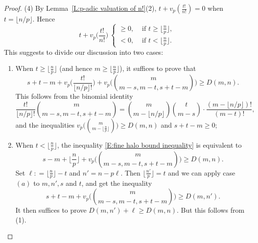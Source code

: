\documentclass[12pt]{amsart}
\theoremstyle{definition}
\numberwithin{equation}{subsection}
\begin{document}
\begin{proof}
(4) By Lemma~\ref{L:p-adic valuation of n!}(2),
$t +v_p(\frac{t!}{n!}) = 0$ when $t = \lfloor n/p\rfloor$. Hence
\[
t+v_p\Big(\frac{t!}{n!}\Big)\ \begin{cases}
\geq 0, &\text{~if~} t\geq \lfloor \frac np\rfloor,\\
<0, &\text{~if~} t<\lfloor\frac np\rfloor.
\end{cases}
\]
This suggests to divide our discussion into two cases:
\begin{enumerate}
\item[(a)] When $t\geq \lfloor\frac np\rfloor$ (and hence $m\geq \lfloor \frac np\rfloor$), it suffices to prove that
			$$
			s+t-m +v_p\Big(\frac{t!}{\lfloor n/p\rfloor!}\Big) + v_p \Big( \binom m{m-s, m-t, s+t-m} \Big) \geq D(m,n).
			$$
			This follows from the binomial identity
			$$
			\frac{t!}{\lfloor n/p\rfloor!}\binom m{m-s, m-t, s+t-m} = \binom m{m-\lfloor n/p\rfloor} \binom t{m-s} \cdot\frac{(m-\lfloor n/p\rfloor)!}{(m-t)!},
			$$
and the inequalities $v_p\big( \binom m{m-\lfloor\frac np\rfloor}\big) \geq D(m,n)$ and $s+t-m\geq 0$;
\item[(b)] When $t< \lfloor \frac np\rfloor$, the inequality 
\eqref{E:fine halo bound inequality} is equivalent to
			\begin{equation}
			\label{E:expression >=D}
			s-m + \Big\lfloor\frac np\Big\rfloor+v_p \Big( \binom m{m-s, m-t, s+t-m} \Big) \geq D(m,n).
			\end{equation}
			Set $\ell : = \lfloor\frac np\rfloor - t$ and $n' = n - p\ell$. Then $\lfloor \frac{n'}p\rfloor=t$ and we can apply case $(a)$ to $m,n',s$ and $t$, and get the inequality
			\[
			s+t-m+v_p \Big( \binom m{m-s, m-t, s+t-m} \Big) \geq D(m,n').
			\]
It then suffices to prove $D(m,n')+\ell\geq D(m,n)$. But this follows from (1).\qedhere
\end{enumerate}
\end{proof}
\end{document}
